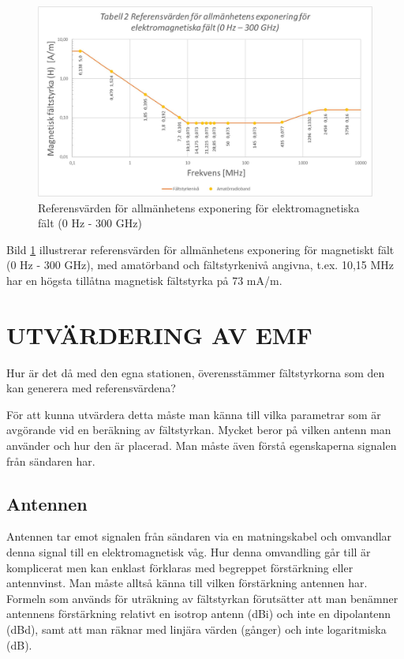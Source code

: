 \begin{figure}[h]
\begin{center}
\includegraphics[width=14cm]{images/emfbild-001}
\caption{Referensvärden för allmänhetens exponering för elektromagnetiska fält (0 Hz - 300 GHz)}
\label{fig:emf2}
\end{center}
\end{figure}

Bild \ref{fig:emf2} illustrerar referensvärden för allmänhetens
exponering för magnetiskt fält (0 Hz - 300 GHz), med amatörband
och fältstyrkenivå angivna, t.ex. 10,15 MHz har en högsta tillåtna
magnetisk fältstyrka på 73 mA/m.

\section{UTVÄRDERING AV EMF}

Hur är det då med den egna stationen, överensstämmer fältstyrkorna som
den kan generera med referensvärdena?

För att kunna utvärdera detta måste man känna till vilka parametrar
som är avgörande vid en beräkning av fältstyrkan. Mycket beror på
vilken antenn man använder och hur den är placerad.
Man måste även förstå egenskaperna signalen från sändaren har.

\subsection{Antennen}

Antennen tar emot signalen från sändaren via en matningskabel och
omvandlar denna signal till en elektromagnetisk våg. Hur denna
omvandling går till är komplicerat men kan enklast förklaras med
begreppet förstärkning eller antennvinst. Man måste alltså känna
till vilken förstärkning antennen har. Formeln som används för
uträkning av fältstyrkan förutsätter att man benämner antennens
förstärkning relativt en isotrop antenn (dBi) och inte en
dipolantenn (dBd), samt att man räknar med linjära värden (gånger)
och inte logaritmiska (dB).

